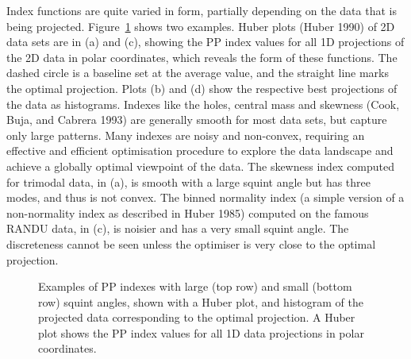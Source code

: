 \documentclass[
  12pt,
]{interact}
\theoremstyle{plain}
\begin{document}
Index functions are quite varied in form, partially depending on the
data that is being projected. Figure~\ref{fig-example-functions} shows
two examples. Huber plots (Huber 1990) of 2D data sets are in (a) and
(c), showing the PP index values for all 1D projections of the 2D data
in polar coordinates, which reveals the form of these functions. The
dashed circle is a baseline set at the average value, and the straight
line marks the optimal projection. Plots (b) and (d) show the respective
best projections of the data as histograms. Indexes like the holes,
central mass and skewness (Cook, Buja, and Cabrera 1993) are generally
smooth for most data sets, but capture only large patterns. Many indexes
are noisy and non-convex, requiring an effective and efficient
optimisation procedure to explore the data landscape and achieve a
globally optimal viewpoint of the data. The skewness index computed for
trimodal data, in (a), is smooth with a large squint angle but has three
modes, and thus is not convex. The binned normality index (a simple
version of a non-normality index as described in Huber 1985) computed on
the famous RANDU data, in (c), is noisier and has a very small squint
angle. The discreteness cannot be seen unless the optimiser is very
close to the optimal projection.

\begin{figure}


\caption{\label{fig-example-functions}Examples of PP indexes with large
(top row) and small (bottom row) squint angles, shown with a Huber plot,
and histogram of the projected data corresponding to the optimal
projection. A Huber plot shows the PP index values for all 1D data
projections in polar coordinates.}

\end{figure}%
\end{document}
